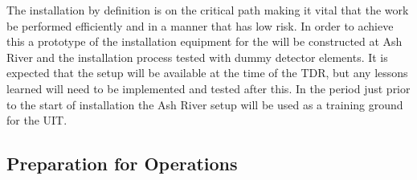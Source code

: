 The installation by definition is on the critical path making it vital
that the work be performed efficiently and in a manner that has low
risk. In order to achieve this a prototype of the installation
equipment for the   will be constructed at Ash
River and the installation process tested with dummy detector
elements. It is expected that the setup will be available at the time
of the TDR, but any lessons learned will need to be implemented and
tested after this. In the period just prior to the start of
installation the Ash River setup will be used as a training ground for
the UIT.



%

\subsection{Preparation for Operations}

